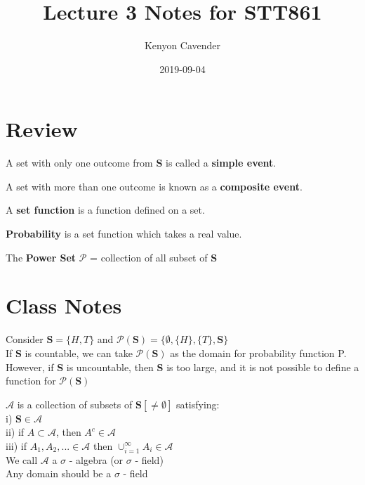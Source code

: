\documentclass[12pt, oneside, letterpaper]{notes}
\begin{document}
\title{Lecture 3 Notes for STT861}
\author{Kenyon Cavender}
\date{2019-09-04}
\maketitle

\section{Review}
\begin{mydef}
	A set with only one outcome from \textbf{S} is called a \textbf{simple event}.
\end{mydef}

\begin{mydef}
	A set with more than one outcome is known as a \textbf{composite event}.
\end{mydef}

\begin{mydef}
	A \textbf{set function} is a function defined on a set.
\end{mydef}

\begin{mydef}
	\textbf{Probability} is a set function which takes a real value.  
\end{mydef}

\begin{mydef}
	The \textbf{Power Set} $\mathscr{P}$ = collection of all subset of \textbf{S}
\end{mydef}

\section{Class Notes}
\begin{remark}
	Consider $\textbf{S} = \{H, T\}$ and $\mathscr{P}(\textbf{S}) = \{\emptyset, 
	\{H\}, \{T\}, \textbf{S} \}$ \\
	\indent If \textbf{S} is countable, we can take $\mathscr{P}(\textbf{S}) $
	as the domain for probability function P.  \\
	\indent However, if \textbf{S} is uncountable, then \textbf{S} is too large, 
	and it is not possible to define a function for $\mathscr{P}(\textbf{S}) $
\end{remark}

\begin{mydef}
	$\mathscr{A}$ is a collection of subsets of $\textbf{S}[\neq \emptyset]$
	satisfying: \\
	\indent i) $\textbf{S} \in \mathscr{A}$ \\
	\indent ii) if $ A \subset \mathscr{A}$, then $A^c \in \mathscr{A}$ \\
	\indent iii) if $A_1, A_2, ... \in \mathscr{A}$ then 
	$\cup_{i=1}^{\infty} A_i \in \mathscr{A} $ \\
	We call $\mathscr{A}$ a $\sigma$ - algebra (or $\sigma$ - field) \\
	Any domain should be a $\sigma$ - field
\end{mydef}
\end{document}
